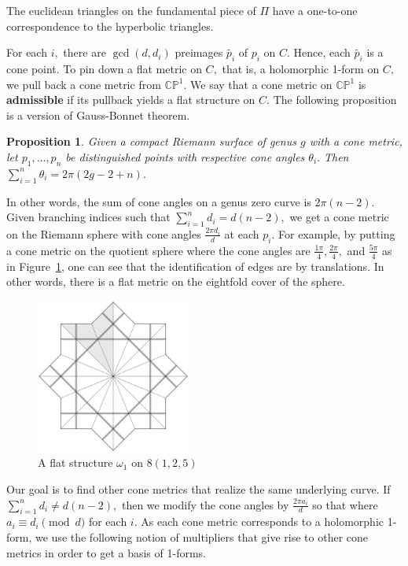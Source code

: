 \documentclass[12pt,reqno]{amsart}
\newtheorem*{proposition}{Proposition}
\theoremstyle{definition}
\theoremstyle{remark}
\begin{document}
The euclidean triangles on the fundamental piece of $\Pi$ have a one-to-one correspondence to the hyperbolic triangles.

For each $i,$ there are $\gcd(d, d_i)$ preimages $\widetilde{p_i}$ of $p_i$ on $C.$ Hence, each $\widetilde{p_i}$ is a cone point. To pin down a flat metric on $C,$ that is, a holomorphic 1-form on $C,$ we pull back a cone metric from $\mathbb{C}\mathbb{P}^1.$ We say that a cone metric on $\mathbb{C}\mathbb{P}^1$ is \textbf{admissible} if its pullback yields a flat structure on $C.$ The following proposition is a version of Gauss-Bonnet theorem.

\begin{proposition} Given a compact Riemann surface of genus $g$ with a cone metric, let $p_1, \ldots, p_n$ be distinguished points with respective cone angles $\theta_i.$ Then $\sum\limits_{i=1}^n \theta_i = 2 \pi (2 g - 2 + n).$
\end{proposition}

In other words, the sum of cone angles on a genus zero curve is $2 \pi (n - 2).$ Given branching indices such that $\sum\limits_{i=1}^n d_i = d (n - 2),$ we get a cone metric on the Riemann sphere with cone angles $\frac{2 \pi d_i}{d}$ at each $p_i.$ For example, by putting a cone metric on the quotient sphere where the cone angles are $\frac{1 \pi}{4}, \frac{2 \pi}{4},$ and $\frac{5 \pi}{4}$ as in Figure~\ref{fig:125_flat}, one can see that the identification of edges are by translations. In other words, there is a flat metric on the eightfold cover of the sphere. 

\begin{figure}[htbp] %
   \centering
   \includegraphics[width=2in]{figures/125_flat.pdf} 
	\caption{A flat structure $\omega_1$ on $8(1, 2, 5)$}
	\label{fig:125_flat}
\end{figure}

Our goal is to find other cone metrics that realize the same underlying curve. If $\sum\limits_{i=1}^n d_i \neq d (n - 2),$ then we modify the cone angles by $\frac{2 \pi a_i}{d}$ so that where $a_i \equiv d_i \pmod d$ for each $i.$ As each cone metric corresponds to a holomorphic 1-form, we use the following notion of multipliers that give rise to other cone metrics in order to get a basis of 1-forms.
\end{document}
